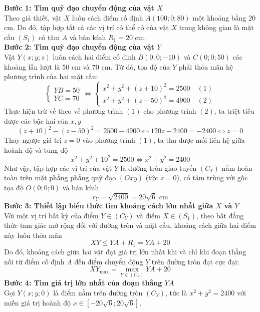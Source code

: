 \begin{ex}
{\begin{center}
		\end{center}
		\textbf{Bước 1: Tìm quỹ đạo chuyển động của vật $X$}\\
		Theo giả thiết, vật $X$ luôn cách điểm cố định $A(100;0;80)$ một khoảng bằng $20$ cm. Do đó, tập hợp tất cả các vị trí có thể có của vật $X$ trong không gian là mặt cầu $(S_1)$ có tâm $A$ và bán kính $R_1 = 20 \text{ cm}.$\\
		\textbf{Bước 2: Tìm quỹ đạo chuyển động của vật $Y$}\\
		Vật $Y(x;y;z)$ luôn cách hai điểm cố định $B(0;0;-10)$ và $C(0;0;50)$ các khoảng lần lượt là $50$ cm và $70$ cm. Từ đó, tọa độ của $Y$ phải thỏa mãn hệ phương trình của hai mặt cầu:
		$$\begin{cases} YB = 50 \\ YC = 70
		\end{cases} \iff \begin{cases} x^2 + y^2 + (z+10)^2 = 2500 \quad (1) \\ x^2 + y^2 + (z-50)^2 = 4900 \quad (2)
		\end{cases}$$
		Thực hiện trừ vế theo vế phương trình $(1)$ cho phương trình $(2)$, ta triệt tiêu được các bậc hai của $x, y$
		$$(z+10)^2 - (z-50)^2 = 2500 - 4900 \iff 120z - 2400 = -2400 \iff z = 0$$
		Thay ngược giá trị $z = 0$ vào phương trình $(1)$, ta thu được mối liên hệ giữa hoành độ và tung độ
		$$x^2 + y^2 + 10^2 = 2500 \iff x^2 + y^2 = 2400$$
		Như vậy, tập hợp các vị trí của vật $Y$ là đường tròn giao tuyến $(C_Y)$ nằm hoàn toàn trên mặt phẳng phẳng quỹ đạo $(Oxy)$ (tức $z=0$), có tâm trùng với gốc tọa độ $O(0;0;0)$ và bán kính
		$$r_Y = \sqrt{2400} = 20\sqrt{6} \text{ cm}$$
		\textbf{Bước 3: Thiết lập biểu thức tìm khoảng cách lớn nhất giữa $X$ và $Y$}\\
		Với một vị trí bất kỳ của điểm $Y \in (C_Y)$ và điểm $X \in (S_1)$, theo bất đẳng thức tam giác mở rộng đối với đường tròn và mặt cầu, khoảng cách giữa hai điểm này luôn thỏa mãn$$XY \le YA + R_1 = YA + 20$$
		Do đó, khoảng cách giữa hai vật đạt giá trị lớn nhất khi và chỉ khi đoạn thẳng nối từ điểm cố định $A$ đến điểm chuyển động $Y$ trên đường tròn đạt cực đại:
		$$XY_{\max} = \max_{Y \in (C_Y)} YA + 20$$
		\textbf{Bước 4: Tìm giá trị lớn nhất của đoạn thẳng $YA$}\\
		Gọi $Y(x;y;0)$ là điểm nằm trên đường tròn $(C_Y)$, tức là $x^2 + y^2 = 2400$ với miền giá trị hoành độ $x \in [-20\sqrt{6}; 20\sqrt{6}]$.\\
}
\end{ex}
